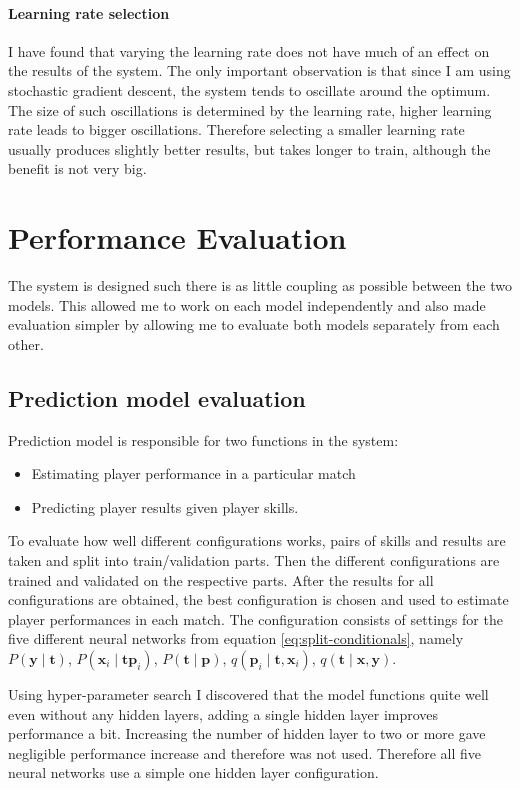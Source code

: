 \documentclass[12pt,a4paper]{book}
\newcommand\bs[1]{\boldsymbol{#1}}
\begin{document}
\paragraph{Learning rate selection}
I have found that varying the learning rate does not have much of an effect on the results of the system.
The only important observation is that since I am using stochastic gradient descent, the system tends to oscillate around the optimum.
The size of such oscillations is determined by the learning rate, higher learning rate leads to bigger oscillations.
Therefore selecting a smaller learning rate usually produces slightly better results, but takes longer to train, although the benefit is not very big.

\section{Performance Evaluation}
The system is designed such there is as little coupling as possible between the two models.
This allowed me to work on each model independently and also made evaluation simpler by allowing me to evaluate both models separately from each other.
\subsection{Prediction model evaluation}
Prediction model is responsible for two functions in the system:
\begin{itemize}
\item Estimating player performance in a particular match
\item Predicting player results given player skills.
\end{itemize}

To evaluate how well different configurations works, pairs of skills and results are taken and split into train/validation parts.
Then the different configurations are trained and validated on the respective parts.
After the results for all configurations are obtained, the best configuration is chosen and used to estimate player performances in each match.
The configuration consists of settings for the five different neural networks from equation \ref{eq:split-conditionals}, namely 
$P(\bs{y}\mid\bs{t})$, $P(\bs{x}_i \mid \bs{t} \bs{p}_i)$, $P(\bs{t} \mid \bs{p})$, $q(\bs{p}_i \mid \bs{t},\bs{x}_i)$, $q(\bs{t}\mid\bs{x},\bs{y})$.

Using hyper-parameter search I discovered that the model functions quite well even without any hidden layers, adding a single hidden layer improves performance a bit.
Increasing the number of hidden layer to two or more gave negligible performance increase and therefore was not used.
Therefore all five neural networks use a simple one hidden layer configuration.
\end{document}
